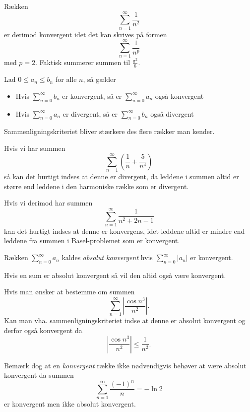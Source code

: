 \begin{eks} 
  Rækken
  \[ 
  \sum_{n = 1}^{\infty} \frac{1}{n^2}
  \]
  er derimod konvergent idet det kan skrives på formen
    \[ 
  \sum_{n =1}^{\infty} \frac{1}{n^{p}}
  \]
  med $p = 2$. Faktisk summerer summen til $\frac{\pi^2}{6}$.
\end{eks}

\begin{sæt} [Sammenligningskriteriet]
  Lad $0 \leq a_n \leq b_n$ for alle $n$, så gælder
  \begin{itemize}
    \item Hvis $\sum_{n = 0}^{\infty} b_n$ er konvergent, så er $\sum_{n = 0}^{\infty} a_n$ også konvergent
    \item Hvis $\sum_{n = 0}^{\infty} a_n$ er divergent, så er $\sum_{n = 0}^{\infty} b_n$ også divergent
  \end{itemize}
  Sammenligningskriteriet bliver stærkere des flere rækker man kender.
\end{sæt}

\begin{eks} 
  Hvis vi har summen
  \[ 
  \sum_{n = 1}^{\infty} \left( \frac{1}{n} + \frac{5}{n^{4}} \right)
  \]
  så kan det hurtigt indses at denne er divergent, da leddene i summen altid er større end leddene i den harmoniske række som er divergent.

  Hvis vi derimod har summen
  \[ 
  \sum_{n = 1}^{\infty} \frac{1}{n^2 + 2n - 1}
  \]
  kan det hurtigt indses at denne er konvergens, idet leddene altid er mindre end leddene fra summen i Basel-problemet som er konvergent.
\end{eks}

\begin{definition} 
  Rækken $\sum_{n = 0}^{\infty} a_n$ kaldes \textit{absolut konvergent} hvis $\sum_{n = 0}^{\infty} |a_n|$ er konvergent.
\end{definition}

\begin{sæt} 
  Hvis en sum er absolut konvergent så vil den altid også være konvergent.
\end{sæt}

\begin{eks}
  Hvis man ønsker at bestemme om summen
  \[ 
  \sum_{n = 1}^{\infty} \left| \frac{\cos n^3}{n^2} \right|
  .\]
  Kan man vha. sammenligningskriteriet indse at denne er absolut konvergent og derfor også konvergent da
  \[ 
  \left| \frac{\cos n^3}{n^2} \right| \leq \frac{1}{n^2}
  .\]
\end{eks}
Bemærk dog at en \textit{konvergent} række ikke nødvendigvis behøver at være absolut konvergent da summen
\[ 
\sum_{n = 1}^{\infty} \frac{(-1)^{n}}{n} = -\ln 2
\]
er konvergent men ikke absolut konvergent. 

